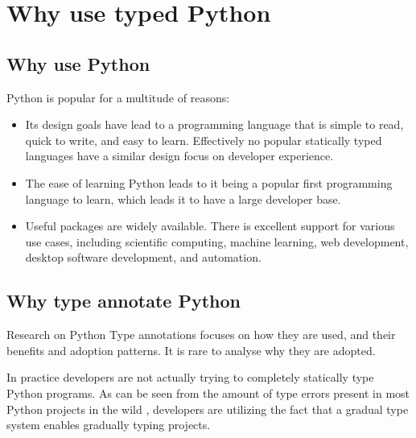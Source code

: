 \chapter{Why use typed Python\label{discussion}}  

\section{Why use Python}
Python is popular for a multitude of reasons:

\begin{itemize}
    \item Its design goals have lead to a programming language that is simple to read, quick to write, and easy to learn. Effectively no popular statically typed languages have a similar design focus on developer experience.
    \item The ease of learning Python leads to it being a popular first programming language to learn, which leads it to have a large developer base.
    \item Useful packages are widely available. There is excellent support for various use cases, including scientific computing, machine learning, web development, desktop software development, and automation. 
\end{itemize}

\section{Why type annotate Python}

Research on Python Type annotations focuses on how they are used, and their benefits and adoption patterns. It is rare to analyse why they are adopted.

In practice developers are not actually trying to completely statically type Python programs. As can be seen from the amount of type errors present in most Python projects in the wild \cite{di_grazia_evolution_2022, rak-amnouykit_taleoftwo_2020,}, developers are utilizing the fact that a gradual type system enables gradually typing projects.


